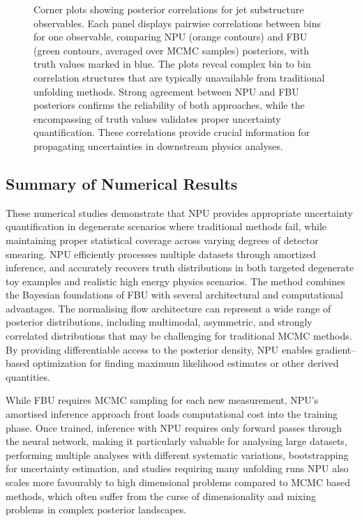 {\begin{figure}
\caption[Corner plots for jet substructure observables]{Corner plots showing posterior correlations for jet substructure observables.
Each panel displays pairwise correlations between bins for one observable, comparing NPU (orange contours) and FBU (green contours, averaged over MCMC samples) posteriors, with truth values marked in blue.
The plots reveal complex bin to bin correlation structures that are typically unavailable from traditional unfolding methods.
Strong agreement between NPU and FBU posteriors confirms the reliability of both approaches, while the encompassing of truth values validates proper uncertainty quantification.
These correlations provide crucial information for propagating uncertainties in downstream physics analyses.\footnotemark
}
\label{fig:phys-corner}
\end{figure}        
\subsection{Summary of Numerical Results}
    These numerical studies demonstrate that NPU provides appropriate uncertainty quantification in degenerate scenarios where traditional methods fail, while maintaining proper statistical coverage across varying degrees of detector smearing.
    NPU efficiently processes multiple datasets through amortized inference, and accurately recovers truth distributions in both targeted degenerate toy examples and realistic high energy physics scenarios.
    The method combines the Bayesian foundations of FBU with several architectural and computational advantages.
    The normalising flow architecture can represent a wide range of posterior distributions, including multimodal, asymmetric, and strongly correlated distributions that may be challenging for traditional MCMC methods.
    By providing differentiable access to the posterior density, NPU enables gradient--based optimization for finding maximum likelihood estimates or other derived quantities.

    While FBU requires MCMC sampling for each new measurement, NPU's amortised inference approach front loads computational cost into the training phase.
    Once trained, inference with NPU requires only forward passes through the neural network, making it particularly valuable for analysing large datasets, performing multiple analyses with different systematic variations, bootstrapping for uncertainty estimation, and studies requiring many unfolding runs
    NPU also scales more favourably to high dimensional problems compared to MCMC based methods, which often suffer from the curse of dimensionality and mixing problems in complex posterior landscapes.
    
}
